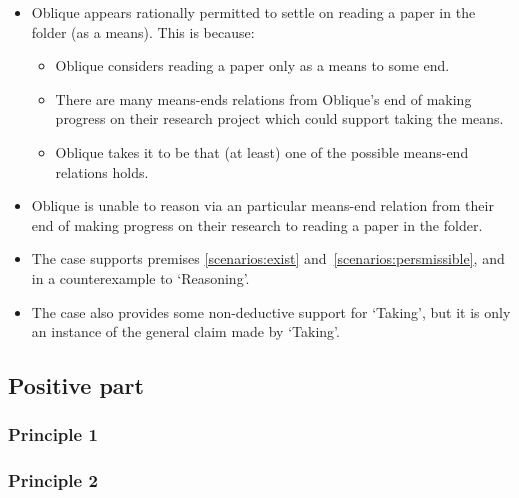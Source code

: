 \documentclass[10pt]{article}
\begin{document}
\begin{itemize}
\item Oblique appears rationally permitted to settle on reading a paper in the folder (as a means).
  This is because:
  \begin{itemize}
  \item Oblique considers reading a paper only as a means to some end.
  \item There are many means-ends relations from Oblique's end of making progress on their research project which could support taking the means.
  \item Oblique takes it to be that (at least) one of the possible means-end relations holds.
  \end{itemize}
\item Oblique is unable to reason via an particular means-end relation from their end of making progress on their research to reading a paper in the folder.
\end{itemize}


\begin{itemize}
\item The case supports premises \ref{scenarios:exist} and~\ref{scenarios:persmissible}, and in a counterexample to `Reasoning'.
\item The case also provides some non-deductive support for `Taking', but it is only an instance of the general claim made by `Taking'.
\end{itemize}


\newpage

\subsection{Positive part}
\label{sec:positive-part}


\subsubsection{Principle 1}
\label{sec:principle-1}


\subsubsection{Principle 2}
\label{sec:principle-2}

\end{document}
